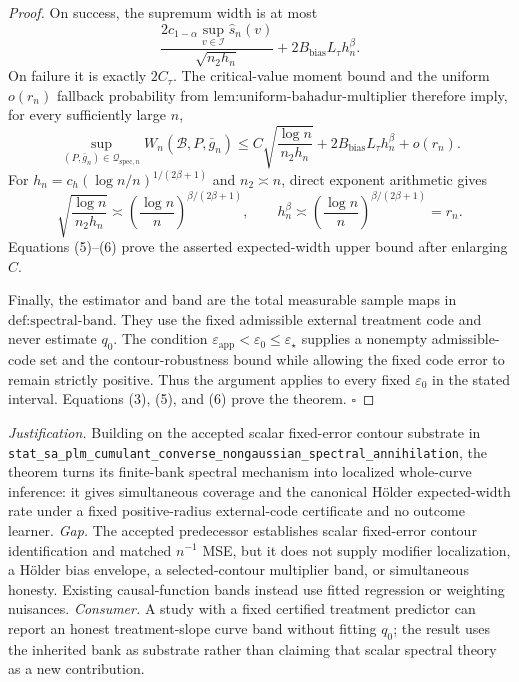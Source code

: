 \documentclass{article}
\begin{document}
\begin{proof}
On success, the supremum width is at most
\[
 \frac{2\widehat c_{1-\alpha}\sup_{v\in\mathcal I}\widehat s_n(v)}
 {\sqrt{n_2h_n}}
 +2B_{\mathrm{bias}}L_\tau h_n^\beta. \tag{4}
\]
On failure it is exactly \(2C_\tau\).  The critical-value moment bound and the uniform \(o(r_n)\) fallback probability from \(\text{lem:uniform-bahadur-multiplier}\) therefore imply, for every sufficiently large \(n\),
\[
 \sup_{(P,\bar g_n)\in\mathcal Q_{\mathrm{spec},n}}
 W_n(\mathcal B,P,\bar g_n)
 \le C\sqrt{\frac{\log n}{n_2h_n}}
 +2B_{\mathrm{bias}}L_\tau h_n^\beta+o(r_n). \tag{5}
\]
For \(h_n=c_h(\log n/n)^{1/(2\beta+1)}\) and \(n_2\asymp n\), direct exponent arithmetic gives
\[
 \sqrt{\frac{\log n}{n_2h_n}}
 \asymp
 \left(\frac{\log n}{n}\right)^{\beta/(2\beta+1)},
 \qquad
 h_n^\beta
 \asymp
 \left(\frac{\log n}{n}\right)^{\beta/(2\beta+1)}
 =r_n. \tag{6}
\]
Equations (5)--(6) prove the asserted expected-width upper bound after enlarging \(C\).

Finally, the estimator and band are the total measurable sample maps in \(\text{def:spectral-band}\).  They use the fixed admissible external treatment code and never estimate \(q_0\).  The condition \(\varepsilon_{\mathrm{app}}<\varepsilon_0\le\varepsilon_\star\) supplies a nonempty admissible-code set and the contour-robustness bound while allowing the fixed code error to remain strictly positive.  Thus the argument applies to every fixed \(\varepsilon_0\) in the stated interval.  Equations (3), (5), and (6) prove the theorem. \(\square\)
\end{proof}
\par\smallskip\noindent \textit{Justification.} Building on the accepted scalar fixed-error contour substrate in \texttt{stat\_sa\_plm\_cumulant\_converse\_nongaussian\_spectral\_annihilation}, the theorem turns its finite-bank spectral mechanism into localized whole-curve inference: it gives simultaneous coverage and the canonical Hölder expected-width rate under a fixed positive-radius external-code certificate and no outcome learner. \textit{Gap.} The accepted predecessor establishes scalar fixed-error contour identification and matched \(n^{-1}\) MSE, but it does not supply modifier localization, a Hölder bias envelope, a selected-contour multiplier band, or simultaneous honesty. Existing causal-function bands instead use fitted regression or weighting nuisances. \textit{Consumer.} A study with a fixed certified treatment predictor can report an honest treatment-slope curve band without fitting \(q_0\); the result uses the inherited bank as substrate rather than claiming that scalar spectral theory as a new contribution.
\end{document}
